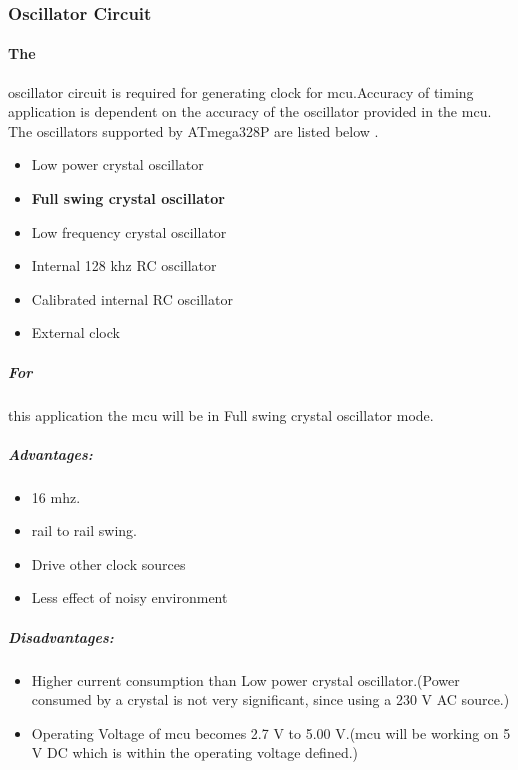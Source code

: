 

\subsubsection{Oscillator Circuit}

	\paragraph{The} oscillator circuit is required for generating clock for \gls{mcu}.Accuracy of timing application is dependent on the accuracy of the oscillator provided in the \gls{mcu}. The oscillators supported by ATmega328P are listed below \cite{AtMega328P}.
		\begin{itemize}
			\item Low power crystal oscillator
			\item \textbf{Full swing crystal oscillator}
			\item Low frequency crystal oscillator
			\item Internal 128 \gls{khz} RC oscillator
			\item Calibrated internal RC oscillator
			\item External clock
		\end{itemize}		
		
	\subparagraph{For }
	this application the \gls{mcu} will be in Full swing crystal oscillator mode.
	
	\subparagraph{\textbf{Advantages:}}
		
		\begin{itemize}
			\item 16 \gls{mhz}.
			\item rail to rail swing.
			\item Drive other clock sources
			\item Less effect of noisy environment 
		\end{itemize}		
	 
	 \subparagraph{Disadvantages:}
	 
	 	\begin{itemize}
	 		\item Higher current consumption than Low power crystal oscillator.(Power consumed by a crystal is not very significant, since using a 230 V AC source.)
	 		\item Operating Voltage of \gls{mcu} becomes 2.7 V to 5.00 V.(\gls{mcu} will be working on 5 V DC which is within the operating voltage defined.) 
		\end{itemize}	  	  
		
